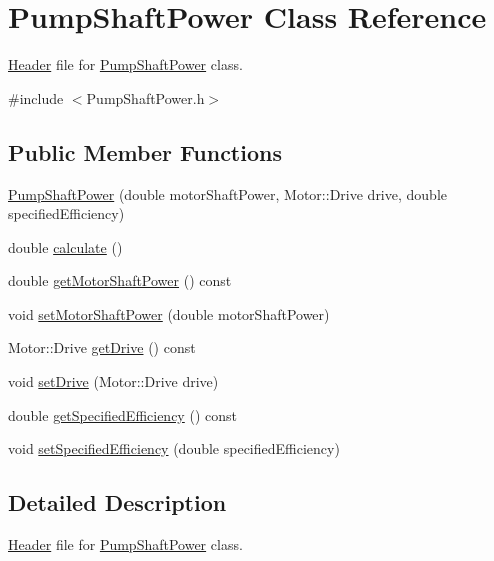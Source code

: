 \hypertarget{class_pump_shaft_power}{}\section{Pump\+Shaft\+Power Class Reference}
\label{class_pump_shaft_power}


\hyperlink{class_header}{Header} file for \hyperlink{class_pump_shaft_power}{Pump\+Shaft\+Power} class.  




{\ttfamily \#include $<$Pump\+Shaft\+Power.\+h$>$}

\subsection*{Public Member Functions}
\begin{DoxyCompactItemize}
\item 
\hyperlink{class_pump_shaft_power_a7eea468dbb3efe1f0e8ae77a2d16efe2}{Pump\+Shaft\+Power} (double motor\+Shaft\+Power, Motor\+::\+Drive drive, double specified\+Efficiency)
\item 
double \hyperlink{class_pump_shaft_power_aad32bf26469a5f2984c85ba07c3f84d9}{calculate} ()
\item 
double \hyperlink{class_pump_shaft_power_acb91eadb960f946ffee5373d4839a5be}{get\+Motor\+Shaft\+Power} () const
\item 
void \hyperlink{class_pump_shaft_power_a77b8c621c7c92841dbd00112437c413b}{set\+Motor\+Shaft\+Power} (double motor\+Shaft\+Power)
\item 
Motor\+::\+Drive \hyperlink{class_pump_shaft_power_a382653196fd65562cd3823049ab7573a}{get\+Drive} () const
\item 
void \hyperlink{class_pump_shaft_power_a5cbcf0acd63ae4a2ffe9a5c13ba73a3a}{set\+Drive} (Motor\+::\+Drive drive)
\item 
double \hyperlink{class_pump_shaft_power_a93c70d2b6f70d6d98b97859fc095193a}{get\+Specified\+Efficiency} () const
\item 
void \hyperlink{class_pump_shaft_power_a7d2c64ba11fb287d9b46f7d0890ee988}{set\+Specified\+Efficiency} (double specified\+Efficiency)
\end{DoxyCompactItemize}


\subsection{Detailed Description}
\hyperlink{class_header}{Header} file for \hyperlink{class_pump_shaft_power}{Pump\+Shaft\+Power} class. 

